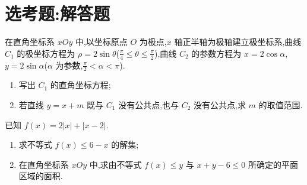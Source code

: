 \section{选考题:解答题}

\begin{problem}
在直角坐标系 \(xOy\) 中,以坐标原点 \(O\) 为极点,\(x\) 轴正半轴为极轴建立极坐标系,曲线 \(C_1\) 的极坐标方程为 \(\rho=2\sin\theta\)(\(\frac{\pi}{4}\le\theta\le\frac{\pi}{2}\)),曲线 \(C_2\) 的参数方程为 \(x=2\cos\alpha\),\(y=2\sin\alpha\)(\(\alpha\) 为参数,\(\frac{\pi}{2}<\alpha<\pi\)).

\begin{enumerate}
\item 写出 \(C_1\) 的直角坐标方程;
\item 若直线 \(y=x+m\) 既与 \(C_1\) 没有公共点,也与 \(C_2\) 没有公共点,求 \(m\) 的取值范围.
\end{enumerate}
\end{problem}

\begin{problem}
已知 \(f(x)=2|x|+|x-2|\).

\begin{enumerate}
\item 求不等式 \(f(x)\le6-x\) 的解集;
\item 在直角坐标系 \(xOy\) 中,求由不等式 \(f(x)\le y\) 与 \(x+y-6\le0\) 所确定的平面区域的面积.
\end{enumerate}
\end{problem}

